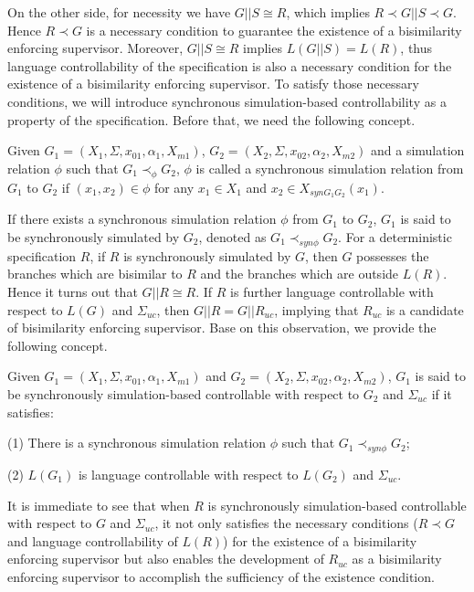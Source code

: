 \documentclass[preprint,authoryear,12pt]{elsarticle}
\begin{document}
On the other side, for necessity we have $G||S \cong R$, which
implies $R \prec G||S \prec G$. Hence $R \prec G$ is a necessary
condition to guarantee the existence of a bisimilarity enforcing
supervisor. Moreover, $G||S \cong R$ implies $L(G||S)=L(R)$, thus
language controllability of the specification is also a necessary
condition for the existence of a bisimilarity enforcing
supervisor. To satisfy those necessary conditions, we will
introduce synchronous simulation-based controllability as a
property of the specification. Before that, we need the following
concept.


\begin{Definition}
Given $G_{1} =(X_{1},\Sigma,x_{01},\alpha_{1},X_{m1})$, $G_{2}
=(X_{2},\Sigma,x_{02},\alpha_{2},X_{m2})$ and a simulation
relation $\phi$ such that $G_{1} \prec_{\phi} G_{2}$, $\phi$ is
called a synchronous simulation relation from $G_1$ to $G_2$ if
$(x_1, x_2) \in \phi$ for any $x_1 \in X_1$ and $x_2 \in
X_{synG_1G_2}(x_1)$.
\end{Definition}

If there exists a synchronous simulation relation $\phi$ from
$G_1$ to $G_2$, $G_1$ is said to be synchronously simulated by
$G_2$, denoted as $G_1 \prec_{syn\phi} G_{2}$. For a deterministic
specification $R$, if $R$ is synchronously simulated by $G$, then
$G$ possesses the branches which are bisimilar to $R$ and the
branches which are outside $L(R)$. Hence it turns out that $G||R
\cong R$. If $R$ is further language controllable with respect to
$L(G)$ and $\Sigma_{uc}$, then $G||R=G||R_{uc}$, implying that
$R_{uc}$ is a candidate of bisimilarity enforcing supervisor. Base
on this observation, we provide the following concept.





\begin{Definition}\label{syncdef}
Given $G_1 =(X_1,\Sigma,x_{01},\alpha_1,X_{m1})$ and $G_2
=(X_2,\Sigma,x_{02},\alpha_2,X_{m2})$, $G_1$ is said to be
synchronously simulation-based controllable with respect to $G_2$
and $\Sigma_{uc}$ if it satisfies:

(1) There is a synchronous simulation relation $\phi$ such that
$G_1 \prec_{syn\phi} G_{2}$;

(2) $L(G_1)$ is language controllable with respect to $L(G_2)$ and
$\Sigma_{uc}$.

\end{Definition}

It is immediate to see that when $R$ is synchronously
simulation-based controllable with respect to $G$ and
$\Sigma_{uc}$, it not only satisfies the necessary conditions ($R
\prec G$ and language controllability of $L(R)$) for the existence
of a bisimilarity enforcing supervisor but also enables the
development of $R_{uc}$ as a bisimilarity enforcing supervisor to
accomplish the sufficiency of the existence condition.
\end{document}

